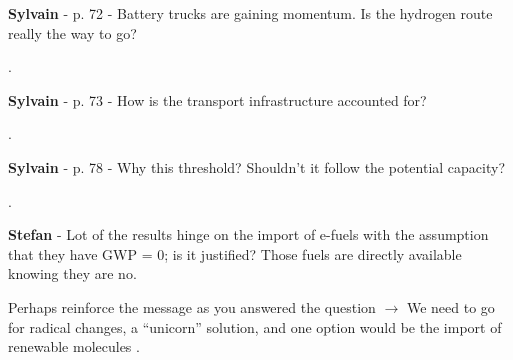 \documentclass[12pt,a4paper]{article}
\begin{document}
\begin{mdframed}[style=comment] %
{\color{purple} \textbf{Sylvain}} - p. 72 - Battery trucks are gaining momentum. Is the hydrogen route really the way to go?
\end{mdframed}

\noindent {\color{blue} }. 

\begin{mdframed}[style=manuscript] %

\end{mdframed}

\begin{mdframed}[style=comment] %
{\color{purple} \textbf{Sylvain}} - p. 73 - How is the transport infrastructure accounted for?
\end{mdframed}

\noindent {\color{blue} }. 

\begin{mdframed}[style=manuscript] %

\end{mdframed}

\begin{mdframed}[style=comment] %
{\color{purple} \textbf{Sylvain}} - p. 78 - Why this threshold? Shouldn't it follow the potential capacity?
\end{mdframed}

\noindent {\color{blue} }. 

\begin{mdframed}[style=manuscript] %

\end{mdframed}

\begin{mdframed}[style=comment] %
{\color{teal} \textbf{Stefan}} - Lot of the results hinge on the import of e-fuels with the assumption that they have GWP = 0; is it justified? Those fuels are directly available knowing they are no.
\end{mdframed}

\noindent Perhaps reinforce the message as you answered the question $\rightarrow$ We need to go for radical changes, a “unicorn” solution, and one option would be the import of renewable molecules {\color{blue} }. 

\begin{mdframed}[style=manuscript] %

\end{mdframed}
\end{document}
